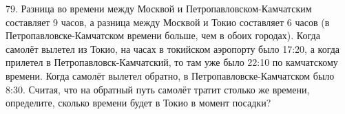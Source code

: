 79. Разница во времени между Москвой и Петропавловском-Камчатским составляет 9 часов, а разница между Москвой и Токио составляет 6 часов (в Петропавловске-Камчатском времени больше, чем в обоих городах). Когда самолёт вылетел из Токио, на часах в токийском аэропорту было 17:20, а когда прилетел в Петропавловск-Камчатский, то там уже было 22:10 по камчатскому времени. Когда самолёт вылетел обратно, в Петропавловске-Камчатском было 8:30. Считая, что на обратный путь самолёт тратит столько же времени, определите, сколько времени будет в Токио в момент посадки?\\
